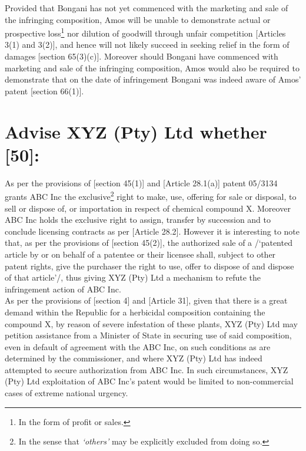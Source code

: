 \documentclass[11pt]{article}
\begin{document}
Provided that Bongani has not yet commenced with the marketing and sale of the
infringing composition, Amos will be unable to demonstrate actual or prospective loss\footnote{In the form of profit or sales.} nor
dilution of goodwill through unfair competition [Articles 3(1) and
3(2)]\cite{wipo96_model_provi_unfair_comp}, and hence will not likely
succeed in seeking relief in the form of damages [section
65(3)(c)]\cite{rsa78_patents_act}. Moreover should Bongani have commenced with
marketing and sale of the infringing composition, Amos would also be required to demonstrate
that on the date of infringement Bongani was indeed aware of Amos' patent
[section 66(1)]\cite{rsa78_patents_act}.
\section{Advise XYZ (Pty) Ltd whether [50]:}
\label{sec:orga4157cc}
As per the provisions of [section 45(1)]\cite{rsa78_patents_act} and [Article 28.1(a)]\cite{wto17_trips} patent 05/3134 grants ABC Inc
the exclusive\footnote{In the sense that \emph{`others'} may be explicitly excluded from doing so.} right to make, use, offering for sale or
disposal, to sell or dispose of, or importation in respect of chemical compound X. Moreover ABC Inc holds the exclusive right to
assign, transfer by succession and to conclude licensing contracts as per [Article 28.2]\cite{wto17_trips}. However it is
interesting to note that, as per the provisions of [section 45(2)]\cite{rsa78_patents_act}, the authorized sale of a /`patented
article by or on behalf of a patentee or their licensee shall, subject to other patent rights, give the purchaser the right to
use, offer to dispose of and dispose of that article'/, thus giving XYZ (Pty) Ltd a mechanism to refute the infringement action of
ABC Inc.\\

As per the provisions of [section 4]\cite{rsa78_patents_act} and [Article 31]\cite{wto17_trips}, given that there is a great demand
within the Republic for a herbicidal composition containing the compound X, by reason of severe infestation of these plants, XYZ
(Pty) Ltd may petition assistance from a Minister of State in securing use of said composition, even in default of agreement with
the ABC Inc, on such conditions as are determined by the commissioner, and where XYZ (Pty) Ltd has indeed attempted to secure
authorization from ABC Inc. In such circumstances, XYZ (Pty) Ltd exploitation of ABC Inc's patent would be limited to
non-commercial cases of extreme national urgency.\\
\end{document}
